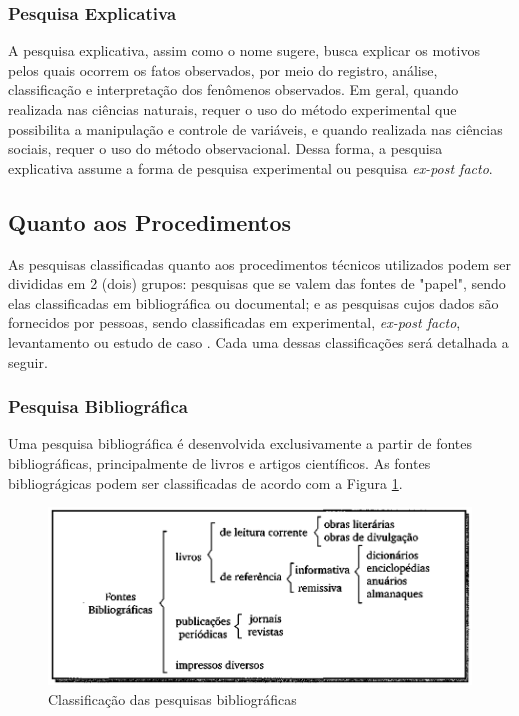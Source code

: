 \subsubsection{Pesquisa Explicativa}
	A pesquisa explicativa, assim como o nome sugere, busca explicar os motivos pelos quais ocorrem os fatos observados, por meio do registro, análise, classificação e interpretação dos fenômenos observados. 
Em geral, quando realizada nas ciências naturais, requer o uso do método experimental que possibilita a manipulação e controle de variáveis, e quando realizada nas ciências sociais, requer o uso do método observacional. Dessa forma, a pesquisa explicativa assume a forma de pesquisa experimental ou pesquisa \textit{ex-post facto}. \cite{prodanov2013metodologia}

\subsection{Quanto aos Procedimentos}
	As pesquisas classificadas quanto aos procedimentos técnicos utilizados podem ser divididas em 2 (dois) grupos: pesquisas que se valem das fontes de "papel", sendo elas classificadas em bibliográfica ou documental; e as pesquisas cujos dados são fornecidos por pessoas, sendo classificadas em experimental, \textit{ex-post facto}, levantamento ou estudo de caso \cite{ac2002elaborar}. Cada uma dessas classificações será detalhada a seguir.

\subsubsection{Pesquisa Bibliográfica} 
	Uma pesquisa bibliográfica é desenvolvida exclusivamente a partir de fontes bibliográficas, principalmente de livros e artigos científicos. As fontes bibliográgicas podem ser classificadas de acordo com a Figura \ref{tiposDePesquisaBibliografica}.

\begin{figure}[h]
\centering
\includegraphics[keepaspectratio=true,scale=0.3]{figuras/tiposDePesquisaBibliografica.png}
\caption{Classificação das pesquisas bibliográficas \cite{ac2002elaborar}}
\label{tiposDePesquisaBibliografica}
\end{figure}
	
